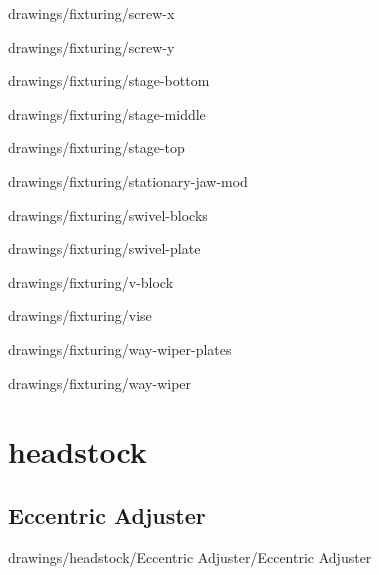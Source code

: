 
{drawings/fixturing/screw-x}


{drawings/fixturing/screw-y}


{drawings/fixturing/stage-bottom}


{drawings/fixturing/stage-middle}


{drawings/fixturing/stage-top}


{drawings/fixturing/stationary-jaw-mod}


{drawings/fixturing/swivel-blocks}


{drawings/fixturing/swivel-plate}


{drawings/fixturing/v-block}


{drawings/fixturing/vise}


{drawings/fixturing/way-wiper-plates}


{drawings/fixturing/way-wiper}

\section{headstock}

\subsection{Eccentric Adjuster}


{drawings/headstock/Eccentric Adjuster/Eccentric Adjuster}

